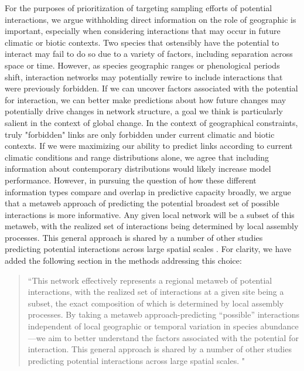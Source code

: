 \documentclass{article}
\begin{document}
    For the purposes of prioritization of targeting sampling efforts of potential interactions, we argue withholding direct information on the role of geographic is important, especially when considering interactions that may occur in future climatic or biotic contexts. Two species that ostensibly have the potential to interact may fail to do so due to a variety of factors, including separation across space or time.  However, as species geographic ranges or phenological periods shift, interaction networks may potentially rewire to include interactions that were previously forbidden. If we can uncover factors associated with the potential for interaction, we can better make predictions about how future changes may potentially drive changes in network structure, a goal we think is particularly salient in the context of global change. In the context of geographical constraints, truly "forbidden" links are only forbidden under current climatic and biotic contexts. If we were maximizing our ability to predict links according to current climatic conditions and range distributions alone, we agree that including information about contemporary distributions would likely increase model performance. However, in pursuing the question of how these different information types compare and overlap in predictive capacity broadly, we argue that a metaweb approach of predicting the potential broadest set of possible interactions is more informative. Any given local network will be a subset of this metaweb, with the realized set of interactions being determined by local assembly processes. This general approach is shared by a number of other studies predicting potential interactions across large spatial scales \cite{hao2025global, strydom2022food, dansereau2024spatially}. For clarity, we have added the following section in the methods addressing this choice:
    
    \begin{quote}
         ``This network effectively represents a regional metaweb of potential interactions, with the realized set of interactions at a given site being a subset, the exact composition of which is determined by local assembly processes. By taking a metaweb approach-predicting “possible” interactions independent of local geographic or temporal variation in species abundance—we aim to better understand the factors associated with the potential for interaction. This general approach is shared by a number of other studies predicting potential interactions across large spatial scales. \cite{hao2025global, strydom2022food, dansereau2024spatially}"
    \end{quote}
    \\
\end{document}
